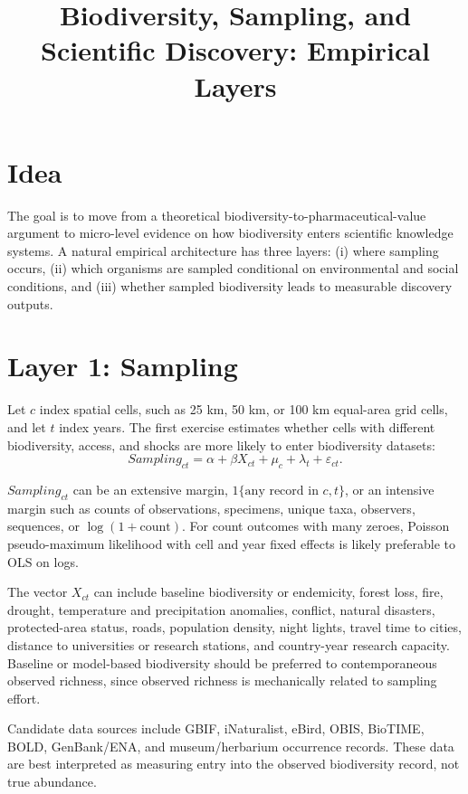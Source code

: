 \documentclass[10pt]{article}
\title{\vspace{-1.2cm}Biodiversity, Sampling, and Scientific Discovery: Empirical Layers}
\author{}
\date{\vspace{-0.8cm}}
\begin{document}
\maketitle
\vspace{-1.2cm}

\section*{Idea}

The goal is to move from a theoretical biodiversity-to-pharmaceutical-value argument to micro-level evidence on how biodiversity enters scientific knowledge systems. A natural empirical architecture has three layers: (i) where sampling occurs, (ii) which organisms are sampled conditional on environmental and social conditions, and (iii) whether sampled biodiversity leads to measurable discovery outputs.

\section*{Layer 1: Sampling}

Let $c$ index spatial cells, such as 25 km, 50 km, or 100 km equal-area grid cells, and let $t$ index years. The first exercise estimates whether cells with different biodiversity, access, and shocks are more likely to enter biodiversity datasets:
\begin{equation}
    Sampling_{ct} = \alpha + \beta X_{ct} + \mu_c + \lambda_t + \varepsilon_{ct}.
\end{equation}

$Sampling_{ct}$ can be an extensive margin, $1\{\text{any record in } c,t\}$, or an intensive margin such as counts of observations, specimens, unique taxa, observers, sequences, or $\log(1+\text{count})$. For count outcomes with many zeroes, Poisson pseudo-maximum likelihood with cell and year fixed effects is likely preferable to OLS on logs.

The vector $X_{ct}$ can include baseline biodiversity or endemicity, forest loss, fire, drought, temperature and precipitation anomalies, conflict, natural disasters, protected-area status, roads, population density, night lights, travel time to cities, distance to universities or research stations, and country-year research capacity. Baseline or model-based biodiversity should be preferred to contemporaneous observed richness, since observed richness is mechanically related to sampling effort.

Candidate data sources include GBIF, iNaturalist, eBird, OBIS, BioTIME, BOLD, GenBank/ENA, and museum/herbarium occurrence records. These data are best interpreted as measuring entry into the observed biodiversity record, not true abundance.
\end{document}
